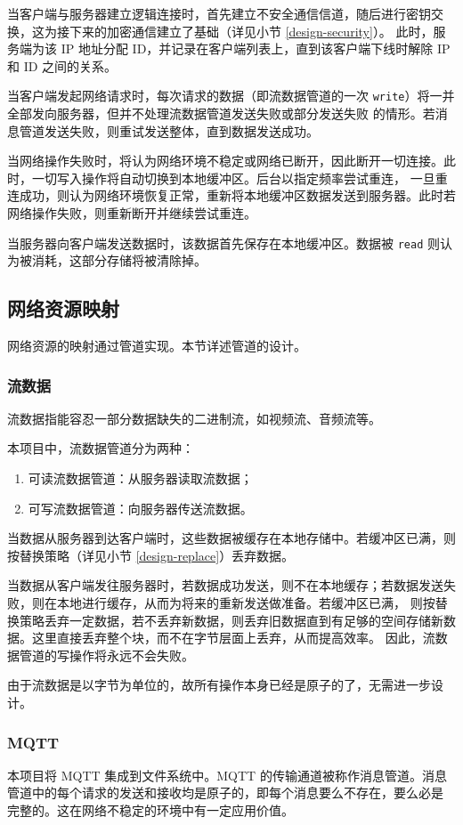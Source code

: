 \documentclass{ctexart}
\begin{document}
当客户端与服务器建立逻辑连接时，首先建立不安全通信信道，随后进行密钥交换，这为接下来的加密通信建立了基础（详见小节 \ref{design-security}）。
此时，服务端为该 IP 地址分配 ID，并记录在客户端列表上，直到该客户端下线时解除 IP 和 ID 之间的关系。

当客户端发起网络请求时，每次请求的数据（即流数据管道的一次 \verb|write|）将一并全部发向服务器，但并不处理流数据管道发送失败或部分发送失败
的情形。若消息管道发送失败，则重试发送整体，直到数据发送成功。

当网络操作失败时，将认为网络环境不稳定或网络已断开，因此断开一切连接。此时，一切写入操作将自动切换到本地缓冲区。后台以指定频率尝试重连，
一旦重连成功，则认为网络环境恢复正常，重新将本地缓冲区数据发送到服务器。此时若网络操作失败，则重新断开并继续尝试重连。

当服务器向客户端发送数据时，该数据首先保存在本地缓冲区。数据被 \verb|read| 则认为被消耗，这部分存储将被清除掉。

\subsection{网络资源映射}
网络资源的映射通过管道实现。本节详述管道的设计。

\subsubsection{流数据}
\label{design-stream}
流数据指能容忍一部分数据缺失的二进制流，如视频流、音频流等。

本项目中，流数据管道分为两种：
\begin{enumerate}
	\item 可读流数据管道：从服务器读取流数据；
	\item 可写流数据管道：向服务器传送流数据。
\end{enumerate}

当数据从服务器到达客户端时，这些数据被缓存在本地存储中。若缓冲区已满，则按替换策略（详见小节 \ref{design-replace}）丢弃数据。

当数据从客户端发往服务器时，若数据成功发送，则不在本地缓存；若数据发送失败，则在本地进行缓存，从而为将来的重新发送做准备。若缓冲区已满，
则按替换策略丢弃一定数据，若不丢弃新数据，则丢弃旧数据直到有足够的空间存储新数据。这里直接丢弃整个块，而不在字节层面上丢弃，从而提高效率。
因此，流数据管道的写操作将永远不会失败。

由于流数据是以字节为单位的，故所有操作本身已经是原子的了，无需进一步设计。

\subsubsection{MQTT}
\label{design-mqtt}
本项目将 MQTT 集成到文件系统中。MQTT 的传输通道被称作消息管道。消息管道中的每个请求的发送和接收均是原子的，即每个消息要么不存在，要么必是
完整的。这在网络不稳定的环境中有一定应用价值。
\end{document}
